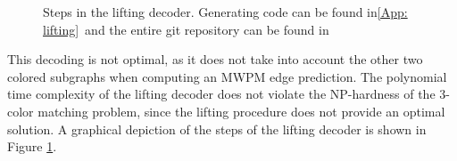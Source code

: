 \begin{figure}[h!]
    \centering
    \hfill
    \hfill
    \hfill
    \caption{Steps in the lifting decoder. Generating code can be found in\ref{App: lifting}\
    and the entire git repository can be found in \cite{clemens}}
    \label{fig: lifting}
\end{figure}
This decoding is not optimal, as it does not take into account the other two colored
subgraphs when computing an MWPM edge prediction.
The polynomial time complexity of the lifting decoder does not
violate the NP-hardness of the 3-color matching problem, since the 
lifting procedure does not provide an optimal solution.
A graphical depiction of the steps of the lifting decoder is shown in
Figure \ref{fig: lifting}.
\newpage